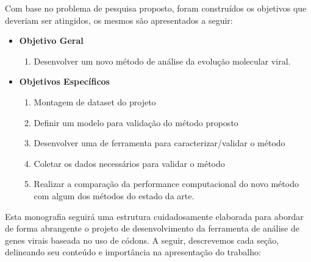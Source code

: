 Com base no problema de pesquisa proposto, foram construídos os objetivos que deveriam ser atingidos, os mesmos são apresentados a seguir:
\begin{itemize}
      \item \textbf{Objetivo Geral}
            \begin{enumerate}[label=~(\roman*)]
                  \item Desenvolver um novo método de análise da evolução molecular viral.
            \end{enumerate}
      \item \textbf{Objetivos Específicos}
            \begin{enumerate}[label=~(\roman*)]
                  \item Montagem de dataset do projeto
                  \item Definir um modelo para validação do método proposto
                  \item Desenvolver uma de ferramenta para caracterizar/validar o método
                  \item Coletar os dados necessários para validar o método
                  \item Realizar a comparação da performance computacional do novo método com algum dos métodos do estado da arte.
            \end{enumerate}
\end{itemize}

Esta monografia seguirá uma estrutura cuidadosamente elaborada para abordar de forma abrangente o projeto de desenvolvimento da ferramenta de análise de genes virais baseada no uso de códons. A seguir, descrevemos cada seção, delineando seu conteúdo e importância na apresentação do trabalho:

